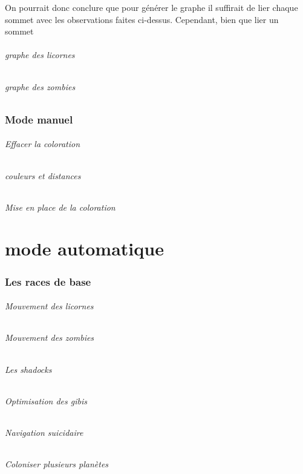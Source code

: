 \documentclass{report}
\begin{document}
			On pourrait donc conclure que pour générer le graphe il suffirait de lier chaque sommet avec les observations faites ci-dessus. Cependant, bien que lier un sommet
			
			
			
			
			
			
			\paragraph{graphe des licornes}
			\paragraph{graphe des zombies}
		\section{Mode manuel}
			\paragraph{Effacer la coloration}
			\paragraph{couleurs et distances}
			\paragraph{Mise en place de la coloration}
			
			
	\part{mode automatique}
		\section{Les races de base}
			\paragraph{Mouvement des licornes}
			\paragraph{Mouvement des zombies}
			\paragraph{Les shadocks}
			\paragraph{Optimisation des gibis}
			\paragraph{Navigation suicidaire}
			\paragraph{Coloniser plusieurs planètes}
	
\end{document}
